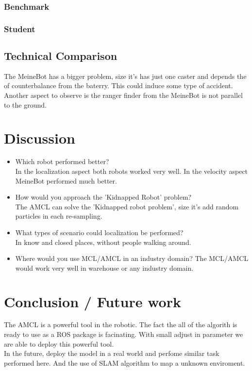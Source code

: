 \documentclass[10pt,journal,compsoc]{IEEEtran}
\begin{document}
\subsubsection{Benchmark}
\subsubsection{Student}

\subsection{Technical Comparison} %

The MeineBot has a bigger problem, size it's has just one caster and depends the of counterbalance from the baterry.
    This could induce some type of accident.
    Another aspect to observe is the ranger finder from the MeineBot is not parallel to the ground.
\section{Discussion}

\begin{itemize}
\item Which robot performed better?\\
  In the localization aspect both robots worked very well. In the velocity aspect MeineBot performed much better.
\item How would you approach the 'Kidnapped Robot' problem?\\
  The AMCL can solve the 'Kidnapped robot problem', size it's add random particles in each re-sampling.
\item What types of scenario could localization be performed?\\
  In know and closed places, without people walking around.
  
\item Where would you use MCL/AMCL in an industry domain?
  The MCL/AMCL would work very well in warehouse or any industry domain.

\end{itemize}

\section{Conclusion / Future work}

The AMCL is a powerful tool in the robotic. The fact the all of the algorith is ready to use as a ROS package is
    facinating. With small adjust in parameter we are able to deploy this powerful tool.\\
    In the future, deploy the model in a real world and perfome similar task performed here. And the use of SLAM
    algorithm to map a unknown enviroment. 




\end{document}
